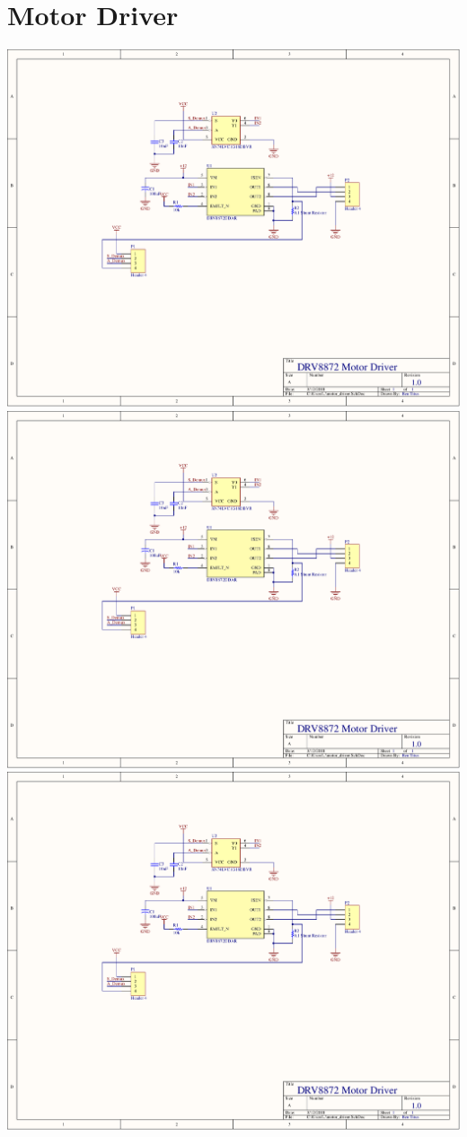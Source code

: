 \section{Motor Driver}
\label{app:motor_driver}
\centering
\includegraphics[page=1,width=\textwidth,angle=270]{PDFs/motor_driver.PDF} \newpage
\includegraphics[page=2,width=\textwidth,angle=270]{PDFs/motor_driver.PDF} \newpage 
\includegraphics[page=3,width=\textwidth,angle=270]{PDFs/motor_driver.PDF} \newpage